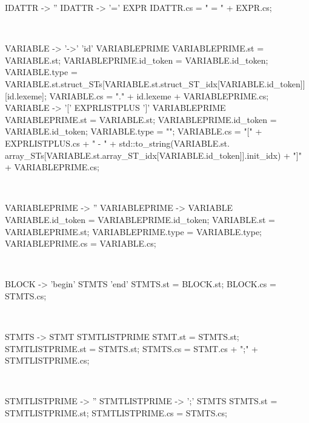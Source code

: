 \begin{verbbox}[\scriptsize]
IDATTR -> '' {}
IDATTR -> '=' EXPR
{
IDATTR.cs = " = " + EXPR.cs;
}
\end{verbbox}
\theverbbox\\

\begin{verbbox}[\scriptsize]
VARIABLE -> '->' 'id' VARIABLEPRIME
{
VARIABLEPRIME.st = VARIABLE.st;
VARIABLEPRIME.id_token = VARIABLE.id_token;
VARIABLE.type = VARIABLE.st.struct_STs[VARIABLE.st.struct_ST_idx[VARIABLE.id_token]][id.lexeme]; 
VARIABLE.cs = "." + id.lexeme + VARIABLEPRIME.cs;
}
VARIABLE -> '[' EXPRLISTPLUS ']' VARIABLEPRIME
{
VARIABLEPRIME.st = VARIABLE.st;
VARIABLEPRIME.id_token = VARIABLE.id_token;
VARIABLE.type = "";
VARIABLE.cs = "[" + EXPRLISTPLUS.cs + " - " + std::to_string(VARIABLE.st.
    array_STs[VARIABLE.st.array_ST_idx[VARIABLE.id_token]].init_idx) + "]" + VARIABLEPRIME.cs;
}
\end{verbbox}
\theverbbox\\

\begin{verbbox}[\scriptsize]
VARIABLEPRIME -> '' {}
VARIABLEPRIME -> VARIABLE
{
VARIABLE.id_token = VARIABLEPRIME.id_token;
VARIABLE.st = VARIABLEPRIME.st;
VARIABLEPRIME.type = VARIABLE.type;
VARIABLEPRIME.cs = VARIABLE.cs;
}
\end{verbbox}
\theverbbox\\

\begin{verbbox}[\scriptsize]
BLOCK -> 'begin' STMTS 'end'
{
STMTS.st = BLOCK.st;
BLOCK.cs = STMTS.cs;
}
\end{verbbox}
\theverbbox\\

\begin{verbbox}[\scriptsize]
STMTS -> STMT STMTLISTPRIME
{
STMT.st = STMTS.st;
STMTLISTPRIME.st = STMTS.st;
STMTS.cs = STMT.cs + ";\n" + STMTLISTPRIME.cs;
}
\end{verbbox}
\theverbbox\\

\begin{verbbox}[\scriptsize]
STMTLISTPRIME -> '' {}
STMTLISTPRIME -> ';' STMTS
{
STMTS.st = STMTLISTPRIME.st;
STMTLISTPRIME.cs = STMTS.cs;
}
\end{verbbox}
\theverbbox\\

